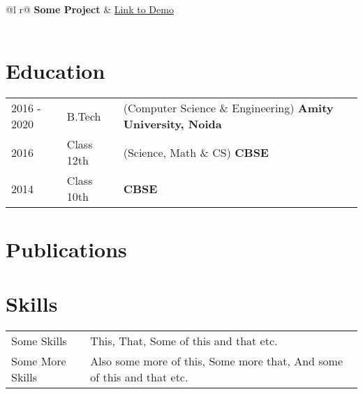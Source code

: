 \documentclass[a4paper,12pt]{article}
\begin{document}
\begin{tabularx}{\linewidth}{ @{}l r@{} }
\textbf{Some Project} & \hfill \href{https://some-link.com}{Link to Demo} \\[3.75pt]
  \\
\end{tabularx}

\section{Education}
\begin{tabularx}{\linewidth}{@{}l l X@{}}	

2016 - 2020 & B.Tech & (Computer Science \& Engineering) \hfill \textbf{Amity University, Noida} \\ 

2016 & Class 12th & (Science, Math \& CS) \hfill \textbf{CBSE} \\ 

2014 & Class 10th &  \hfill \textbf{CBSE} \\ 
\end{tabularx}

\section{Publications}
\begin{refsection}
\nocite{*}
\printbibliography[heading=none]
\end{refsection}

\section{Skills}
\begin{tabularx}{\linewidth}{@{}l X@{}}
Some Skills &  \normalsize{This, That, Some of this and that etc.}\\
Some More Skills  &  \normalsize{Also some more of this, Some more that, And some of this and that etc.}\\  
\end{tabularx}

\vfill
{}
\end{document}
